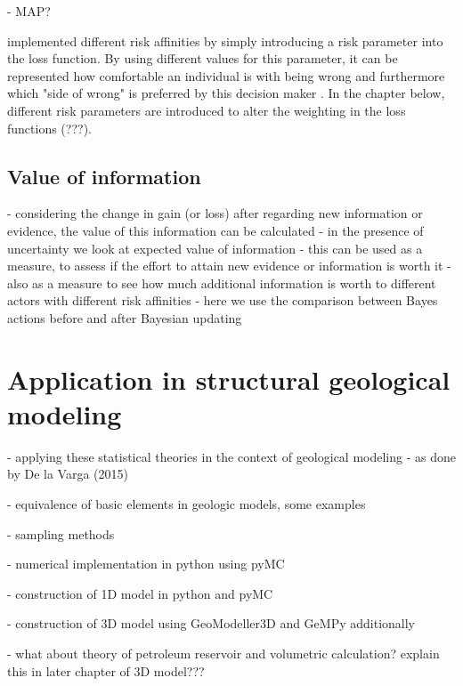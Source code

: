         - MAP?
        
        \cite{davidson2015} implemented different risk affinities by simply  introducing a risk parameter into the loss function. By using different values for this parameter, it can be represented how comfortable an individual is with being wrong and furthermore which "side of wrong" is preferred by this decision maker \cite{davidson2015}. In the chapter below, different risk parameters are introduced to alter the weighting in the loss functions (???).
        
        \subsection{Value of information}
        - considering the change in gain (or loss) after regarding new information or evidence, the value of this information can be calculated
        - in the presence of uncertainty we look at expected value of information
        - this can be used as a measure, to assess if the effort to attain new evidence or information is worth it
        - also as a measure to see how much additional information is worth to different actors with different risk affinities
        - here we use the comparison between Bayes actions before and after Bayesian updating
        
        \section{Application in structural geological modeling}
        
        - applying these statistical theories in the context of geological modeling 
        - as done by De la Varga (2015)
        
        - equivalence of basic elements in geologic models, some examples
        
        - sampling methods
        
        - numerical implementation in python using pyMC
        
        - construction of 1D model in python and pyMC
        
        - construction of 3D model using GeoModeller3D and GeMPy additionally
        
        - what about theory of petroleum reservoir and volumetric calculation? explain this in later chapter of 3D model???     
             
